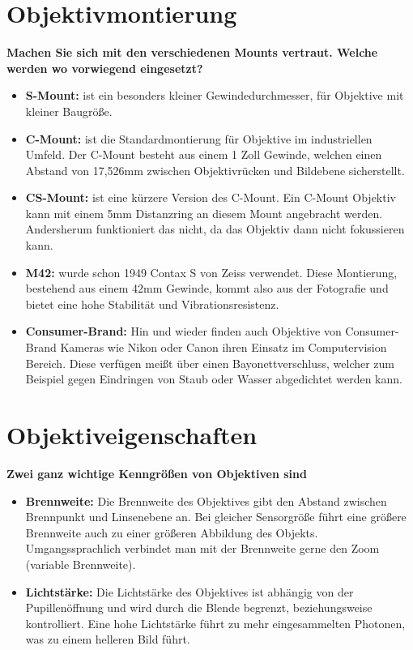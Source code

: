 \documentclass[a4paper]{article}
\begin{document}
	\section{Objektivmontierung}
	\textbf{Machen Sie sich mit den verschiedenen Mounts vertraut. Welche werden wo vorwiegend
		eingesetzt?}\\
	\begin{itemize}
		\item \textbf{S-Mount:} ist ein besonders kleiner Gewindedurchmesser, für Objektive mit kleiner Baugröße.\\
		\item \textbf{C-Mount:} ist die Standardmontierung für Objektive im industriellen Umfeld. Der C-Mount besteht aus einem 1 Zoll Gewinde, welchen einen Abstand von 17,526mm zwischen Objektivrücken und Bildebene sicherstellt.\\
		\item \textbf{CS-Mount:} ist eine kürzere Version des C-Mount. Ein C-Mount Objektiv kann mit einem 5mm Distanzring an diesem Mount angebracht werden. Andersherum funktioniert das nicht, da das Objektiv dann nicht fokussieren kann.\\
		\item \textbf{M42:} wurde schon 1949 Contax S von Zeiss verwendet. Diese Montierung, bestehend aus einem 42mm Gewinde, kommt also aus der Fotografie und bietet eine hohe Stabilität und Vibrationsresistenz.\\
		\item \textbf{Consumer-Brand:} Hin und wieder finden auch Objektive von Consumer-Brand Kameras wie Nikon oder Canon ihren Einsatz im Computervision Bereich. Diese verfügen meißt über einen Bayonettverschluss, welcher zum Beispiel gegen Eindringen von Staub oder Wasser abgedichtet werden kann.\\
	\end{itemize}
	
	\section{Objektiveigenschaften}
	\textbf{Zwei ganz wichtige Kenngrößen von Objektiven sind}\\
	\begin{itemize}
		\item \textbf{Brennweite:} Die Brennweite des Objektives gibt den Abstand zwischen Brennpunkt und Linsenebene an. Bei gleicher Sensorgröße führt eine größere Brennweite auch zu einer größeren Abbildung des Objekts. Umgangssprachlich verbindet man mit der Brennweite gerne den Zoom (variable Brennweite).\\
		\item \textbf{Lichtstärke:} Die Lichtstärke des Objektives ist abhängig von der Pupillenöffnung und wird durch die Blende begrenzt, beziehungsweise kontrolliert. Eine hohe Lichtstärke führt zu mehr eingesammelten Photonen, was zu einem helleren Bild führt.\\
	\end{itemize}
\end{document}
